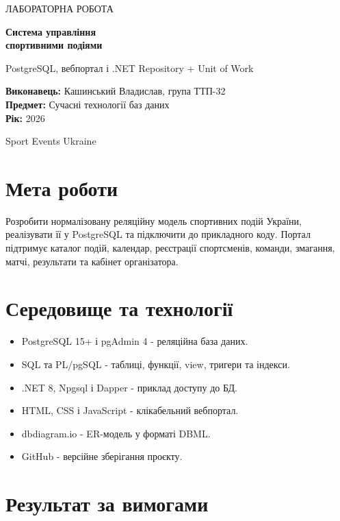 \documentclass[12pt,a4paper]{article}
\begin{document}
\begin{titlepage}
\centering
\vspace*{2.5cm}
{\color{blue}\Large ЛАБОРАТОРНА РОБОТА\par}
\vspace{0.8cm}
{\color{navy}\Huge\bfseries Система управління\\[0.2cm] спортивними подіями\par}
\vspace{1.2cm}
{\large PostgreSQL, вебпортал і .NET Repository + Unit of Work\par}
\vfill
\begin{flushleft}
\textbf{Виконавець:} Кашинський Владислав, група ТТП-32\\[0.4cm]
\textbf{Предмет:} Сучасні технології баз даних\\[0.4cm]
\textbf{Рік:} 2026
\end{flushleft}
\vfill
{\color{navy}\large Sport Events Ukraine\par}
\end{titlepage}

\section{Мета роботи}

Розробити нормалізовану реляційну модель спортивних подій України, реалізувати її у PostgreSQL та підключити до прикладного коду. Портал підтримує каталог подій, календар, реєстрації спортсменів, команди, змагання, матчі, результати та кабінет організатора.

\section{Середовище та технології}

\begin{itemize}
\item PostgreSQL 15+ і pgAdmin 4 - реляційна база даних.
\item SQL та PL/pgSQL - таблиці, функції, view, тригери та індекси.
\item .NET 8, Npgsql і Dapper - приклад доступу до БД.
\item HTML, CSS і JavaScript - клікабельний вебпортал.
\item dbdiagram.io - ER-модель у форматі DBML.
\item GitHub - версійне зберігання проєкту.
\end{itemize}

\section{Результат за вимогами}
\end{document}
